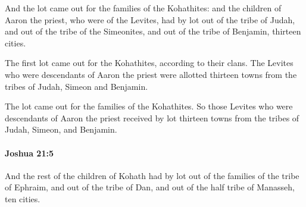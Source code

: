 			\begin{versebox}
					\item[BHS] 
					\item[ASV] And the lot came out for the families of the Kohathites: and the children of Aaron the priest, who were of the Levites, had by lot out of the tribe of Judah, and out of the tribe of the Simeonites, and out of the tribe of Benjamin, thirteen cities.
					\item[NIV] The first lot came out for the Kohathites, according to their clans. The Levites who were descendants of Aaron the priest were allotted thirteen towns from the tribes of Judah, Simeon and Benjamin.
					\item[NRSV] The lot came out for the families of the Kohathites. So those Levites who were descendants of Aaron the priest received by lot thirteen towns from the tribes of Judah, Simeon, and Benjamin.
			\end{versebox}

		\paragraph{Joshua 21:5} %
			\label{JOSHUA-21-5}

			And the rest of the children of Kohath had by lot out of the families of the tribe of Ephraim, and out of the tribe of Dan, and out of the half tribe of Manasseh, ten cities.

